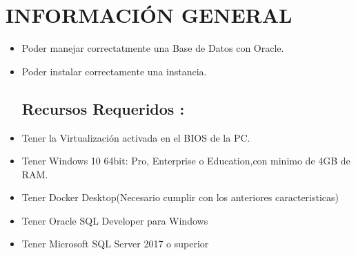 \section{INFORMACIÓN GENERAL} 

\begin{itemize}
\subsection{Objetivos:}
	\item Poder manejar correctatmente una  Base de Datos con Oracle.
	\item Poder instalar correctamente una instancia.
\subsection{Recursos Requeridos :}
	\item Tener la Virtualización activada en el BIOS de la PC.
	\item Tener Windows 10 64bit: Pro, Enterprise o Education,con minimo de  4GB de RAM.
	\item Tener  Docker Desktop(Necesario cumplir con los anteriores caracteristicas)
	\item Tener Oracle SQL Developer para Windows
	\item Tener Microsoft SQL Server 2017 o superior

\end{itemize}
